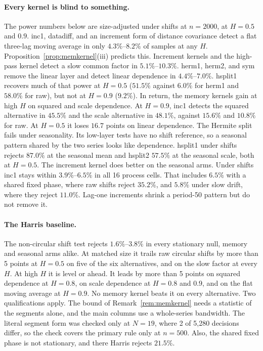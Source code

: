 \documentclass[11pt]{article}
\theoremstyle{remark}
\begin{document}
\paragraph{Every kernel is blind to something.} The power numbers below are size-adjusted under shifts at $n=2000$, at $H=0.5$ and $0.9$. inc1, datadiff, and an increment form of distance covariance detect a flat three-lag moving average in only $4.3\%$--$8.2\%$ of samples at any $H$. Proposition~\ref{prop:memkernel}(iii) predicts this. Increment kernels and the high-pass kernel detect a slow common factor in $5.1\%$--$10.3\%$. herm1, herm2, and sym remove the linear layer and detect linear dependence in $4.4\%$--$7.0\%$. hsplit1 recovers much of that power at $H=0.5$ ($51.5\%$ against $6.0\%$ for herm1 and $58.0\%$ for raw), but not at $H=0.9$ ($9.2\%$). In return, the memory kernels gain at high $H$ on squared and scale dependence. At $H=0.9$, inc1 detects the squared alternative in $45.5\%$ and the scale alternative in $48.1\%$, against $15.6\%$ and $10.8\%$ for raw. At $H=0.5$ it loses $16.7$ points on linear dependence. The Hermite split fails under seasonality. Its low-layer tests have no shift reference, so a seasonal pattern shared by the two series looks like dependence. hsplit1 under shifts rejects $87.0\%$ at the seasonal mean and hsplit2 $57.5\%$ at the seasonal scale, both at $H=0.5$. The increment kernel does better on the seasonal arms. Under shifts inc1 stays within $3.9\%$--$6.5\%$ in all 16 process cells. That includes $6.5\%$ with a shared fixed phase, where raw shifts reject $35.2\%$, and $5.8\%$ under slow drift, where they reject $11.0\%$. Lag-one increments shrink a period-50 pattern but do not remove it.

\paragraph{The Harris baseline.} The non-circular shift test rejects $1.6\%$--$3.8\%$ in every stationary null, memory and seasonal arms alike. At matched size it trails raw circular shifts by more than 5 points at $H=0.5$ on five of the six alternatives, and on the slow factor at every $H$. At high $H$ it is level or ahead. It leads by more than 5 points on squared dependence at $H=0.8$, on scale dependence at $H=0.8$ and $0.9$, and on the flat moving average at $H=0.9$. No memory kernel beats it on every alternative. Two qualifications apply. The bound of Remark~\ref{rem:memkernel} needs a statistic of the segments alone, and the main columns use a whole-series bandwidth. The literal segment form was checked only at $N=19$, where 2 of 5,280 decisions differ, so the check covers the primary rule only at $n=500$. Also, the shared fixed phase is not stationary, and there Harris rejects $21.5\%$.
\end{document}
